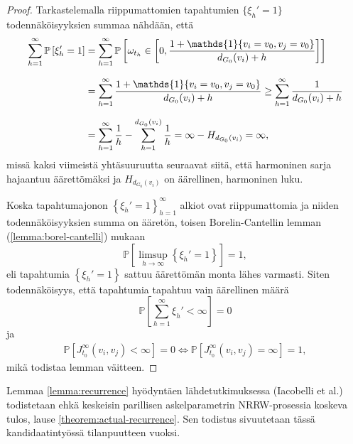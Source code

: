 \documentclass[finnish, 12pt, a4paper, sci, utf8, pdfa]{aaltothesis}
\newcommand{\indicator}{\mathopen{\mathds{1}}}
\newcommand*{\prob}{\mathbb{P}}
\begin{document}
\begin{proof}
   Tarkastelemalla riippumattomien tapahtumien $ \{ \xi_{h}' = 1 \} $ todennäköisyyksien summaa nähdään, että
   \begin{equation*}
      \setlength{\jot}{10pt}
      \begin{aligned}
      \sum_{h = 1}^{\infty} \prob \left[ \xi_{h}' = 1 \right] &= \sum_{h = 1}^{\infty} \prob \left[ \omega_{t_{h}} \in \left[ 0, \frac{1 + \indicator \{ v_{i} = v_{0}, v_{j} = v_{0} \}}{d_{G_{0}}(v_{i}) + h} \right] \right] \\
         &= \sum_{h = 1}^{\infty} \frac{1 + \indicator \left\{ v_{i} = v_{0}, v_{j} = v_{0} \right\}}{d_{G_{0}}(v_{i}) + h} \geq \sum_{h = 1}^{\infty} \frac{1}{d_{G_{0}}(v_{i}) + h} \\
         &= \sum_{h = 1}^{\infty} \frac{1}{h} - \sum_{h = 1}^{d_{G_{0}}(v_{i})} \frac{1}{h} = \infty - H_{d_{G_{0}}(v_{i})} = \infty,
      \end{aligned}
   \end{equation*}
   missä kaksi viimeistä yhtäsuuruutta seuraavat siitä, että harmoninen sarja hajaantuu äärettömäksi ja $ H_{d_{G_{0}}(v_{i})} $ on äärellinen, harmoninen luku.

   Koska tapahtumajonon $ \left\{ \xi_{h}' = 1 \right\}_{h = 1}^{\infty} $ alkiot ovat riippumattomia ja niiden todennäköisyyksien summa on ääretön, toisen Borelin-Cantellin lemman 
   (\ref{lemma:borel-cantelli}) mukaan
   \begin{equation*}
      \prob \left[ \limsup \limits_{h \rightarrow \infty} \left\{ \xi_{h}' = 1 \right\} \right] = 1,
   \end{equation*}
   eli tapahtumia $ \left\{ \xi_{h}' = 1 \right\} $ sattuu äärettömän monta lähes varmasti. Siten todennäköisyys, että tapahtumia tapahtuu vain äärellinen määrä
   \begin{equation*}
      \prob \left[ \sum_{h = 1}^{\infty} \xi_{h}' < \infty \right] = 0
   \end{equation*}
   ja
   \begin{align*}
      \prob \left[ J_{t_{0}}^{\infty}(v_{i}, v_{j}) < \infty \right] = 0 \Leftrightarrow \prob \left[ J_{t_{0}}^{\infty}(v_{i}, v_{j}) = \infty \right] = 1,
   \end{align*}
   mikä todistaa lemman väitteen.
\end{proof}

Lemmaa \ref{lemma:recurrence} hyödyntäen lähdetutkimuksessa (Iacobelli et al.) todistetaan ehkä keskeisin parillisen askelparametrin NRRW-prosessia koskeva tulos, lause \ref{theorem:actual-recurrence}. Sen todistus sivuutetaan tässä kandidaatintyössä tilanpuutteen vuoksi. \cite{Iacobelli}
\end{document}
